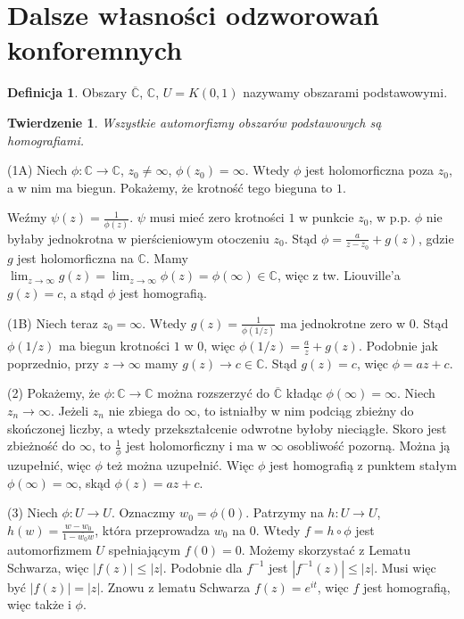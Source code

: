 \documentclass[11pt]{article}
\newcommand{\abs}[1]{\left|#1\right|} %
\newcommand{\closure}[1]{\overline{#1}} %
\newcommand{\extcomplex}{\overline{\mathbb{C}}} %
\theoremstyle{plain}
\newtheorem*{theorem}{Twierdzenie}
\theoremstyle{definition}
\newtheorem*{definition}{Definicja}
\theoremstyle{remark}
\let\oldendproof\endproof
\renewenvironment{proof}[1][\proofname]{
  \oldproof[\textsc{\small #1}]
}{\oldendproof}
\begin{document}
\section{Dalsze własności odzworowań konforemnych}

\begin{definition}
  Obszary $ \extcomplex $, $ \mathbb{C}$, $ U = K(0, 1) $ nazywamy obszarami podstawowymi.
\end{definition}

\begin{theorem}
  Wszystkie automorfizmy obszarów podstawowych są homografiami.
\end{theorem}

\begin{proof}
  (1A) Niech $ \phi : \mathbb{C} \to \mathbb{C} $, $ z_0 \neq \infty $, $ \phi(z_0) = \infty $.
  Wtedy $ \phi $ jest holomorficzna poza $ z_0 $, a w nim ma biegun.
  Pokażemy, że krotność tego bieguna to $1$.

  Weźmy $ \psi(z) = \frac{1}{\phi(z)} $.
  $ \psi $ musi mieć zero krotności $1$ w punkcie $z_0$, w p.p. $ \phi $ nie byłaby jednokrotna w pierścieniowym otoczeniu $ z_0 $.
  Stąd $ \phi = \frac{a}{z-z_0} + g(z) $, gdzie $g$ jest holomorficzna na $ \mathbb{C} $.
  Mamy $ \lim_{z \to \infty} g(z) = \lim_{z \to \infty} \phi(z) = \phi(\infty) \in \mathbb{C} $,
  więc z tw. Liouville'a $ g(z) = c $, a stąd $ \phi $ jest homografią.

  (1B) Niech teraz $ z_0 = \infty $.
  Wtedy $ g(z) = \frac{1}{\phi(1/z)} $ ma jednokrotne zero w $ 0 $.
  Stąd $ \phi(1/z) $ ma biegun krotności $1$ w $0$, więc $ \phi(1/z) = \frac{a}{z} + g(z) $.
  Podobnie jak poprzednio, przy $ z \to \infty $ mamy $ g(z) \to c \in \mathbb{C} $.
  Stąd $ g(z) = c $, więc $ \phi = az + c $.

  (2) Pokażemy, że $ \phi : \mathbb{C} \to \mathbb{C} $ można rozszerzyć do $ \extcomplex $ kładąc $ \phi(\infty) = \infty $.
  Niech $ z_n \to \infty $.
  Jeżeli $ z_n $ nie zbiega do $ \infty $, to istniałby w nim podciąg zbieżny do skończonej liczby, a wtedy przekształcenie odwrotne byłoby nieciągłe.
  Skoro jest zbieżność do $ \infty $, to $ \frac{1}{\phi} $ jest holomorficzny i ma w $\infty$ osobliwość pozorną.
  Można ją uzupełnić, więc $ \phi $ też można uzupełnić.
  Więc $ \phi $ jest homografią z punktem stałym $ \phi(\infty) = \infty $, skąd $ \phi(z) = az + c $.

  (3) Niech $ \phi : U \to U $.
  Oznaczmy $ w_0 = \phi(0) $.
  Patrzymy na $ h:U \to U $, $ h(w) = \frac{w-w_0}{1 - \closure{w_0}w} $, która przeprowadza $w_0$ na $0$.
  Wtedy $ f = h \circ \phi $ jest automorfizmem $U$ spełniającym $ f(0) = 0 $.
  Możemy skorzystać z Lematu Schwarza, więc $ \abs{f(z)} \leq \abs{z} $.
  Podobnie dla $ f^{-1} $ jest $\abs{f^{-1}(z)} \leq \abs{z} $.
  Musi więc być $ \abs{f(z)} = \abs{z} $.
  Znowu z lematu Schwarza $ f(z) = e^{it}$, więc $f$ jest homografią, więc także i $\phi$.
\end{proof}
\end{document}
